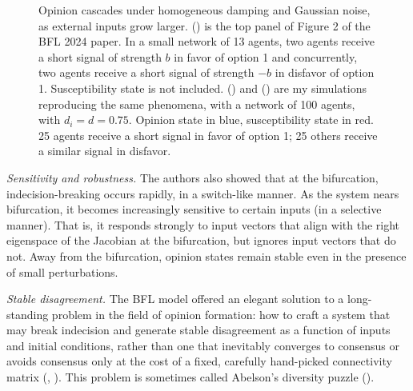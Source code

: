 \documentclass[]{article}
\begin{document}
\begin{figure}
	\caption{Opinion cascades under homogeneous damping and Gaussian noise, as external inputs grow larger. () is the top panel of Figure 2 of the BFL 2024 paper. In a small network of 13 agents, two agents receive a short signal of strength $b$ in favor of option 1 and concurrently, two agents receive a short signal of strength $-b$ in disfavor of option 1. Susceptibility state is not included. () and () are my simulations reproducing the same phenomena, with a network of 100 agents, with $d_i=d=0.75$. Opinion state in blue, susceptibility state in red. 25 agents receive a short signal in favor of option 1; 25 others receive a similar signal in disfavor. }\label{fig:replication}
\end{figure}

\textit{Sensitivity and robustness.} The authors also showed that at the bifurcation, indecision-breaking occurs rapidly, in a switch-like manner. As the system nears bifurcation, it becomes increasingly sensitive to certain inputs (in a selective manner). That is, it responds strongly to input vectors that align with the right eigenspace of the Jacobian at the bifurcation, but ignores input vectors that do not. Away from the bifurcation, opinion states remain stable even in the presence of small perturbations.

\textit{Stable disagreement.} The BFL model offered an elegant solution to a long-standing problem in the field of opinion formation: how to craft a system that may break indecision and generate stable disagreement as a function of inputs and initial conditions, rather than one that inevitably converges to consensus or avoids consensus only at the cost of a fixed, carefully hand-picked connectivity matrix (\cite{ravazziDynamicalSocialNetworks2021}, \cite{bernardoBoundedConfidenceOpinion2024}). This problem is sometimes called Abelson's diversity puzzle (\cite{abelsonMathematicalModelsDistribution1964}). 
\end{document}
